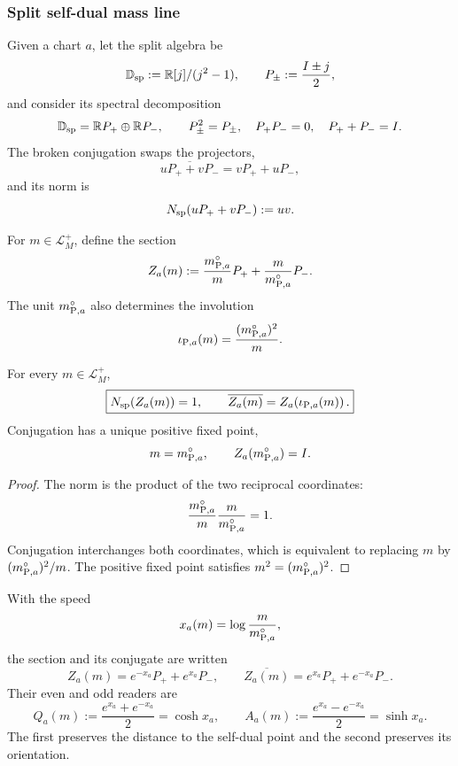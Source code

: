\subsubsection{Split self-dual mass line}

Given a chart \(a\), let the split algebra be
\[
 \mathbb D_{\rm sp}:=\mathbb R[j]/(j^2-1),
 \qquad
 P_\pm:=\frac{I\pm j}{2},
\]
and consider its spectral decomposition
\[
 \mathbb D_{\rm sp}
 =\mathbb R P_+\oplus\mathbb R P_-,
 \qquad
 P_\pm^2=P_\pm,\quad
 P_+P_-=0,\quad
 P_++P_-=I.
\]
The broken conjugation swaps the projectors,
\[
 \overline{uP_++vP_-}=vP_++uP_-,
\]
and its norm is
\[
 N_{\rm sp}(uP_++vP_-):=uv.
\]

For \(m\in\mathcal L_M^+\), define the section
\begin{equation}
 Z_a(m)
 :=\frac{m_{{\rm P},a}^{\circ}}{m}P_+
   +\frac{m}{m_{{\rm P},a}^{\circ}}P_- .
 \label{eq:planck-ct108-seccion-partida-masa-rev3}
\end{equation}
The unit \(m_{{\rm P},a}^{\circ}\) also determines the involution
\begin{equation}
 \iota_{{\rm P},a}(m)
 =\frac{(m_{{\rm P},a}^{\circ})^2}{m}.
 \label{eq:planck-ct108-involucion-masas-rev3}
\end{equation}

\begin{theorem}
\label{thm:planck-ct108-recta-partida-masa-rev3}
For every \(m\in\mathcal L_M^+\),
\begin{equation}
 \boxed{
 N_{\rm sp}(Z_a(m))=1,
 \qquad
 \overline{Z_a(m)}
 =Z_a\!\left(\iota_{{\rm P},a}(m)\right).}
 \label{eq:planck-ct108-norma-conjugacion-rev3}
\end{equation}
Conjugation has a unique positive fixed point,
\[
 m=m_{{\rm P},a}^{\circ},
 \qquad
 Z_a(m_{{\rm P},a}^{\circ})=I.
\]
\end{theorem}

\begin{proof}
The norm is the product of the two reciprocal coordinates:
\[
 \frac{m_{{\rm P},a}^{\circ}}m
 \frac m{m_{{\rm P},a}^{\circ}}=1.
\]
Conjugation interchanges both coordinates, which is equivalent to replacing
\(m\) by \((m_{{\rm P},a}^{\circ})^2/m\). The positive fixed point satisfies
\(m^2=(m_{{\rm P},a}^{\circ})^2\).
\end{proof}

With the speed
\begin{equation}
 x_a(m)=\log\frac{m}{m_{{\rm P},a}^{\circ}},
 \label{eq:planck-ct108-rapidez-masa-rev3}
\end{equation}
the section and its conjugate are written
\[
 Z_a(m)=e^{-x_a}P_++e^{x_a}P_-,
 \qquad
 \overline{Z_a(m)}
 =e^{x_a}P_++e^{-x_a}P_-.
\]
Their even and odd readers are
\begin{equation}
 Q_a(m):=\frac{e^{x_a}+e^{-x_a}}2=\cosh x_a,
 \qquad
 A_a(m):=\frac{e^{x_a}-e^{-x_a}}2=\sinh x_a.
 \label{eq:planck-ct108-lectores-par-impar-rev3}
\end{equation}
The first preserves the distance to the self-dual point and the second preserves its orientation.

